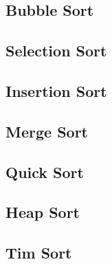 \subsection{Bubble Sort}

\subsection{Selection Sort}

\subsection{Insertion Sort}

\subsection{Merge Sort}

\subsection{Quick Sort}

\subsection{Heap Sort}

\subsection{Tim Sort}

